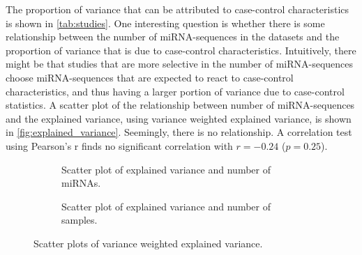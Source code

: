 The proportion of variance that can be attributed to case-control characteristics is shown in \autoref{tab:studies}. One interesting question is whether there is some relationship between the number of miRNA-sequences in the datasets and the proportion of variance that is due to case-control characteristics. Intuitively, there might be that studies that are more selective in the number of miRNA-sequences choose miRNA-sequences that are expected to react to case-control characteristics, and thus having a larger portion of variance due to case-control statistics. A scatter plot of the relationship between number of miRNA-sequences and the explained variance, using variance weighted explained variance, is shown in \autoref{fig:explained_variance}. Seemingly, there is no relationship. A correlation test using Pearson's r finds no significant correlation with $r=-0.24$ ($p=0.25$).
\begin{figure}
    \begin{subfigure}[b]{0.5\textwidth}
        \caption{Scatter plot of explained variance and number of miRNAs.}
        \label{fig:explained_variance}
    \end{subfigure}
    \begin{subfigure}[b]{0.5\textwidth}
        \caption{Scatter plot of explained variance and number of samples.}
        \label{fig:explained_variance_b}
    \end{subfigure}
    \caption{Scatter plots of variance weighted explained variance.}
\end{figure}

